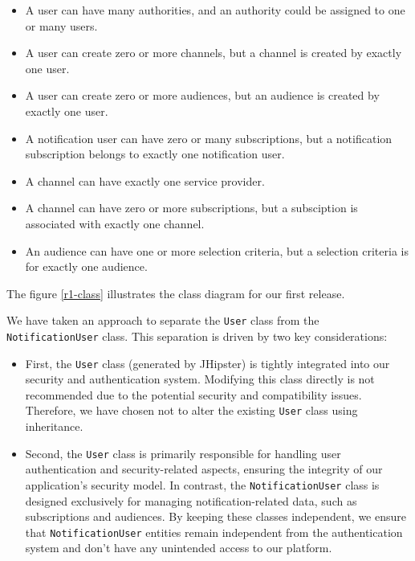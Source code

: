 \begin{itemize}
    \item A user can have many authorities, and an authority could be assigned to one or many users.
    \item A user can create zero or more channels, but a channel is created by exactly one user.
    \item A user can create zero or more audiences, but an audience is created by exactly one user.
    \item A notification user can have zero or many subscriptions, but a notification subscription
          belongs to exactly one notification user.
    \item A channel can have exactly one service provider.
    \item A channel can have zero or more subscriptions, but a subsciption is associated with exactly one channel.
    \item An audience can have one or more selection criteria, but a selection criteria is for exactly one audience.
\end{itemize}

\noindent The figure \ref{r1-class} illustrates the class diagram for our first release.

\noindent We have taken an approach to separate the \texttt{User} class from the
\texttt{NotificationUser} class. This separation is driven by two key considerations:

\begin{itemize}
    \item First, the \texttt{User} class (generated by JHipster) is tightly integrated into our
          security and authentication system. Modifying this class directly is not recommended
          due to the potential security and compatibility issues. Therefore, we have chosen not
          to alter the existing \texttt{User} class using inheritance.

    \item Second, the \texttt{User} class is primarily responsible for handling user authentication and
          security-related aspects, ensuring the integrity of our application's security model. In contrast,
          the \texttt{NotificationUser} class is designed exclusively for managing notification-related data,
          such as subscriptions and audiences. By keeping these classes independent, we ensure that
          \texttt{NotificationUser} entities remain independent from the authentication system and don't
          have any unintended access to our platform. \\
\end{itemize}

